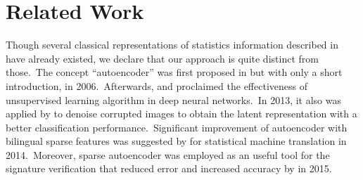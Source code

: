 \section{Related Work}
Though several classical representations of statistics information described in \cite{hyvarinen2009natural} have already existed, we declare that our approach is quite distinct from those.~The concept ``autoencoder'' was first proposed in \cite{hinton2006reducing} but with only a short introduction, in 2006.~Afterwards, \cite{bengio2007greedy} and \cite{erhan2010does} proclaimed the effectiveness of unsupervised learning algorithm in deep neural networks.~In 2013, it also was applied by \cite{icml2013_cho13} to denoise corrupted images to obtain the latent representation with a better classification performance.~Significant improvement of autoencoder with bilingual sparse features was suggested by \cite{zhao2014autoencoder} for statistical machine translation in 2014.~Moreover, sparse autoencoder was employed as an useful tool for the signature verification that reduced error and increased accuracy by \cite{fayyaz2015online} in 2015.